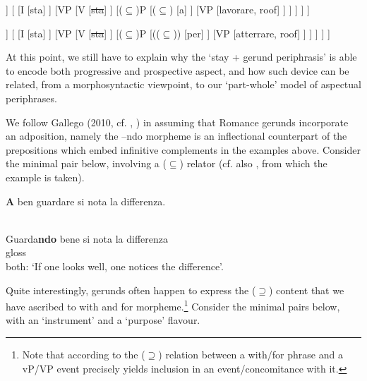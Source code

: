 \documentclass[output=paper,modfonts,nonflat,newtxmath,colorlinks,citecolor=brown]{langsci/langscibook}
\begin{document}
\ea%
    \label{ex:franco:25}
    \begin{forest}
    	[IP
    		[DP
    			[Gianni]
    		]
    		[
    			[I
    				[sta]
    			]
    			[VP
    				[V
    					[\sout{sta}]
    				]	
    				[($\subseteq$)P
    					[($\subseteq$)
    						[a]
    					]
    					[VP
    						[lavorare, roof]
    					]
    				]
    			]
    		]
    	]
    	\end{forest}
    \z
    
    

   
  \ea  \label{ex:franco:26}
    \begin{forest}
    [IP
    		[DP
    			[l'aereo]
    		]
    		[
    			[I
    				[sta]
    			]
    			[VP
    				[V
    					[\sout{sta}]
    				]	
    				[($\subseteq$)P
    					[(($\subseteq$))
    						[per]
    					]
    					[VP
    						[atterrare, roof]
    					]
    				]
    			]
    		]
    	]
    	\end{forest}
    \z
                                                                          

At this point, we still have to explain why the ‘stay + gerund periphrasis’ is able to encode both progressive and prospective aspect, and how such device can be related, from a morphosyntactic viewpoint, to our ‘part-whole’ model of aspectual periphrases.

We follow Gallego (2010, cf. \citealt{Mateu2002}, \citealt{Franco2015}) in assuming that Romance gerunds incorporate an adposition, namely the –{ndo} morpheme is an inflectional counterpart of the prepositions which embed infinitive complements in the examples above. Consider the minimal pair below, involving a (${\subseteq}$) relator (cf. also \citealt{Casalicchio2013}, from which the example  is taken). 

\ea%
    \label{ex:franco:27}
    \ea \label{ex:franco:27a}
    \gll \textbf{{A}} ben guardare si nota la differenza.\\
        \\
    \glt
    
     \ex \label{ex:franco:27b}
    \gll  Guarda\textbf{ndo} bene si nota la differenza\\
       gloss \\
    \glt both: `If one looks well, one notices the difference’.
    \z
    \z

 

Quite interestingly, gerunds often happen to express the (${\supseteq}$) content that we have ascribed to {with} and {for} morpheme.\footnote{Note that according to \citealt{FrancoManzini2017Ins} the (\textrm{${\supseteq}$}) relation between a {with/for} phrase and a vP/VP event precisely yields inclusion in an event/concomitance with it.} Consider the minimal pairs below, with an ‘instrument’  and a ‘purpose’  flavour.
\end{document}
